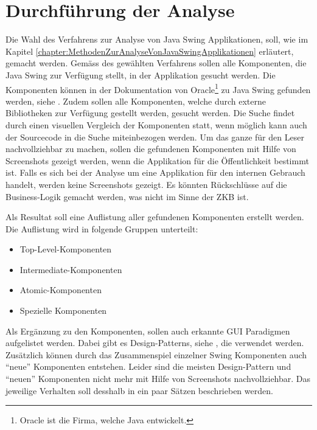   \section{Durchführung der Analyse}
  
  Die Wahl des Verfahrens zur Analyse von Java Swing Applikationen, soll, wie im
  Kapitel \ref{chapter:MethodenZurAnalyseVonJavaSwingApplikationen} erläutert,
  gemacht werden. Gemäss des gewählten Verfahrens sollen alle Komponenten, die
  Java Swing zur Verfügung stellt, in der Applikation gesucht werden. Die
  Komponenten können in der Dokumentation von Oracle\footnote{Oracle ist die
  Firma, welche Java entwickelt.} zu Java Swing gefunden werden, siehe
  \cite{SwingComponentsByOracle}. Zudem sollen alle Komponenten, welche durch
  externe Bibliotheken zur Verfügung gestellt werden, gesucht werden. Die Suche
  findet durch einen visuellen Vergleich der Komponenten statt, wenn möglich
  kann auch der Sourcecode in die Suche miteinbezogen werden. Um das ganze für
  den Leser nachvollziehbar zu machen, sollen die gefundenen Komponenten mit
  Hilfe von Screenshots gezeigt werden, wenn die Applikation für die
  Öffentlichkeit bestimmt ist. Falls es sich bei der Analyse um eine
  Applikation für den internen Gebrauch handelt, werden keine Screenshots
  gezeigt. Es könnten Rückschlüsse auf die Business-Logik gemacht werden, was
  nicht im Sinne der \ac{ZKB} ist.
  
  Als Resultat soll eine Auflistung aller gefundenen Komponenten erstellt
  werden. Die Auflistung wird in folgende Gruppen unterteilt:
  
  \begin{itemize}
    \item Top-Level-Komponenten
    \item Intermediate-Komponenten
    \item Atomic-Komponenten
    \item Spezielle Komponenten
  \end{itemize}
  
  \noindent
  Als Ergänzung zu den Komponenten, sollen auch erkannte GUI Paradigmen
  aufgelistet werden. Dabei gibt es Design-Patterns, siehe
  \cite{DesignPattern}, die verwendet werden. Zusätzlich können durch das
  Zusammenspiel einzelner Swing Komponenten auch ``neue'' Komponenten entstehen.
  Leider sind die meisten Design-Pattern und ``neuen'' Komponenten nicht mehr
  mit Hilfe von Screenshots nachvollziehbar. Das jeweilige Verhalten soll
  desshalb in ein paar Sätzen beschrieben werden.
  
